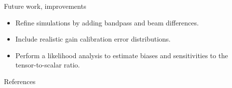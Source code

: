 \documentclass[final]{beamer}
\newlength{\sepwidth}
\newlength{\colwidth}
\newcommand{\separatorcolumn}{\begin{column}{\sepwidth}\end{column}}
\begin{document}
\begin{frame}[t]
\begin{columns}[t]
\begin{column}{\colwidth}
      \begin{block}{Future work, improvements}

        \begin{itemize}
          \item Refine simulations by adding bandpass and beam differences.
          \item Include realistic gain calibration error distributions.
          \item Perform a likelihood analysis to estimate biases and sensitivities to the tensor-to-scalar ratio.
        \end{itemize}

      \end{block}

      \begin{block}{References}

        \nocite{*}
        \footnotesize{\printbibliography}

      \end{block}

    \end{column}

    \separatorcolumn
  \end{columns}
\end{frame}
\end{document}
